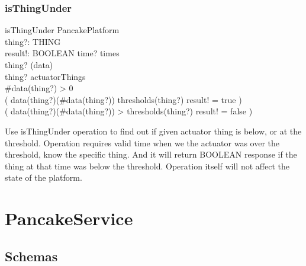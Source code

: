 \documentclass{article}
\begin{document}
\label{toc:isThingUnder}
\subsubsection{isThingUnder}
\begin{schema}{isThingUnder}
  \Xi PancakePlatform \\
  thing?: THING \\
  result!: BOOLEAN 
\where
  time? \in times \\
  thing? \in \dom(data) \\  
  thing? \in actuatorThings \\
  \#data(thing?) > 0 \\
  ( data(thing?)(\#data(thing?)) \leq thresholds(thing?) \land result! = true ) \lor \\
  ( data(thing?)(\#data(thing?)) > thresholds(thing?) \land result! = false ) 
\end{schema}
Use isThingUnder operation to find out if given actuator thing is below, or at the threshold. Operation requires valid time when we the actuator was over the threshold, know the specific thing. And it will return BOOLEAN response if the thing at that time was below the threshold. Operation itself will not affect the state of the platform.





\newpage
\section{PancakeService}
\subsection{Schemas}

\label{toc:Customer}
\end{document}
